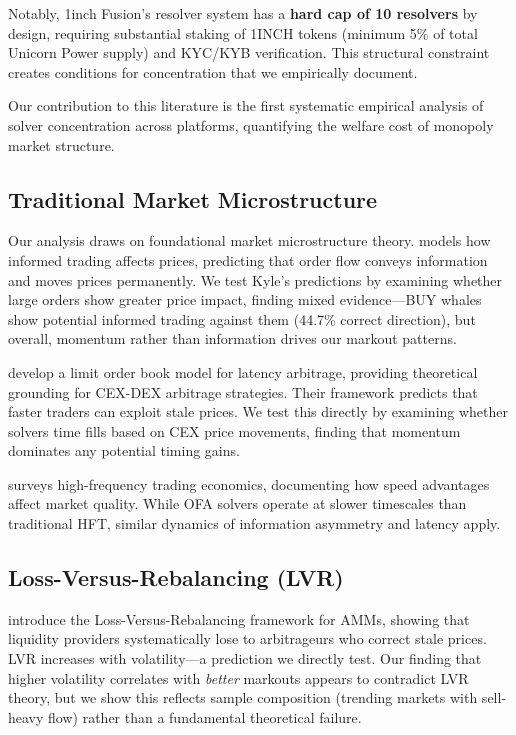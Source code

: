 \documentclass[12pt,a4paper]{article}
\begin{document}
Notably, 1inch Fusion's resolver system has a \textbf{hard cap of 10 resolvers} by design, requiring substantial staking of 1INCH tokens (minimum 5\% of total Unicorn Power supply) and KYC/KYB verification. This structural constraint creates conditions for concentration that we empirically document.

Our contribution to this literature is the first systematic empirical analysis of solver concentration across platforms, quantifying the welfare cost of monopoly market structure.

\subsection{Traditional Market Microstructure}

Our analysis draws on foundational market microstructure theory. \cite{kyle1985} models how informed trading affects prices, predicting that order flow conveys information and moves prices permanently. We test Kyle's predictions by examining whether large orders show greater price impact, finding mixed evidence---BUY whales show potential informed trading against them (44.7\% correct direction), but overall, momentum rather than information drives our markout patterns.

\cite{cohen2012} develop a limit order book model for latency arbitrage, providing theoretical grounding for CEX-DEX arbitrage strategies. Their framework predicts that faster traders can exploit stale prices. We test this directly by examining whether solvers time fills based on CEX price movements, finding that momentum dominates any potential timing gains.

\cite{menkveld2016} surveys high-frequency trading economics, documenting how speed advantages affect market quality. While OFA solvers operate at slower timescales than traditional HFT, similar dynamics of information asymmetry and latency apply.

\subsection{Loss-Versus-Rebalancing (LVR)}

\cite{milionis2022} introduce the Loss-Versus-Rebalancing framework for AMMs, showing that liquidity providers systematically lose to arbitrageurs who correct stale prices. LVR increases with volatility---a prediction we directly test. Our finding that higher volatility correlates with \textit{better} markouts appears to contradict LVR theory, but we show this reflects sample composition (trending markets with sell-heavy flow) rather than a fundamental theoretical failure.
\end{document}
